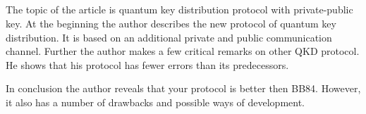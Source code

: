 \subsection{\review}

The topic of the article is quantum key distribution protocol with private-public key. At the beginning the author describes the new protocol of quantum key distribution. It is based on an additional private and public communication channel. Further the author makes a few critical remarks on other QKD protocol. He shows that his protocol has fewer errors than its predecessors.

In conclusion the author reveals that your protocol is better then BB84. However, it also has a number of drawbacks and possible ways of development.
 

\subsection{\dic}
